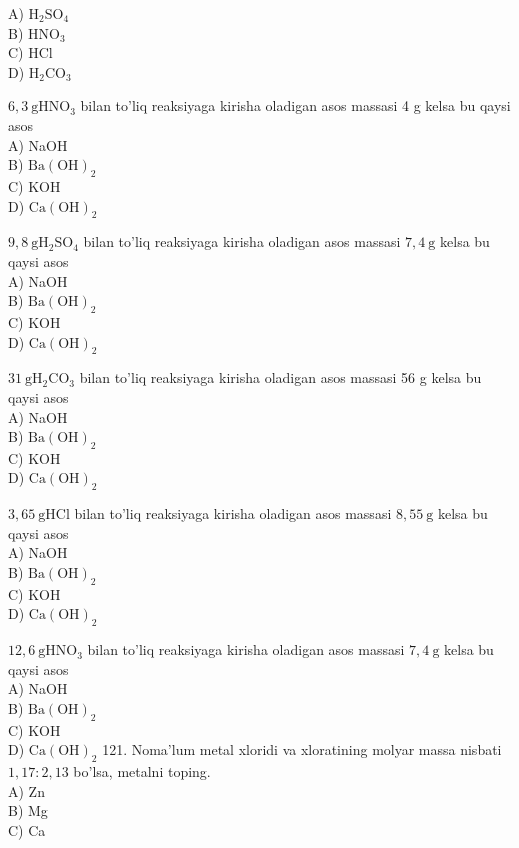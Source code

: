 A) $\mathrm{H}_{2} \mathrm{SO}_{4}$\\
B) $\mathrm{HNO}_{3}$\\
C) HCl\\
D) $\mathrm{H}_{2} \mathrm{CO}_{3}$
  \item $6,3 \mathrm{~g} \mathrm{HNO}_{3}$ bilan to'liq reaksiyaga kirisha oladigan asos massasi 4 g kelsa bu qaysi asos\\
A) NaOH\\
B) $\mathrm{Ba}(\mathrm{OH})_{2}$\\
C) KOH\\
D) $\mathrm{Ca}(\mathrm{OH})_{2}$
  \item $9,8 \mathrm{~g} \mathrm{H}_{2} \mathrm{SO}_{4}$ bilan to'liq reaksiyaga kirisha oladigan asos massasi $7,4 \mathrm{~g}$ kelsa bu qaysi asos\\
A) NaOH\\
B) $\mathrm{Ba}(\mathrm{OH})_{2}$\\
C) KOH\\
D) $\mathrm{Ca}(\mathrm{OH})_{2}$
  \item $31 \mathrm{~g} \mathrm{H}_{2} \mathrm{CO}_{3}$ bilan to'liq reaksiyaga kirisha oladigan asos massasi 56 g kelsa bu qaysi asos\\
A) NaOH\\
B) $\mathrm{Ba}(\mathrm{OH})_{2}$\\
C) KOH\\
D) $\mathrm{Ca}(\mathrm{OH})_{2}$
  \item $3,65 \mathrm{~g} \mathrm{HCl}$ bilan to'liq reaksiyaga kirisha oladigan asos massasi $8,55 \mathrm{~g}$ kelsa bu qaysi asos\\
A) NaOH\\
B) $\mathrm{Ba}(\mathrm{OH})_{2}$\\
C) KOH\\
D) $\mathrm{Ca}(\mathrm{OH})_{2}$
  \item $12,6 \mathrm{~g} \mathrm{HNO}_{3}$ bilan to'liq reaksiyaga kirisha oladigan asos massasi $7,4 \mathrm{~g}$ kelsa bu qaysi asos\\
A) NaOH\\
B) $\mathrm{Ba}(\mathrm{OH})_{2}$\\
C) KOH\\
D) $\mathrm{Ca}(\mathrm{OH})_{2}$
121. Noma'lum metal xloridi va xloratining molyar massa nisbati $1,17: 2,13$ bo'lsa, metalni toping.\\
A) Zn\\
B) Mg\\
C) Ca\\
